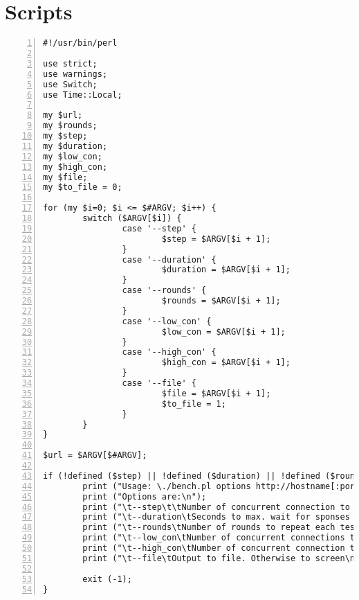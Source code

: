 \documentclass[Scripts]{subfiles}
\begin{document}
\section{Scripts}
\label{sec:Scripts}
\begin{lstlisting}[frame=single,caption=bench.pl,backgroundcolor=\color{gray},breaklines=true,numbers=left,]
#!/usr/bin/perl

use strict;
use warnings;
use Switch;
use Time::Local;

my $url;
my $rounds;
my $step;
my $duration;
my $low_con;
my $high_con;
my $file;
my $to_file = 0;

for (my $i=0; $i <= $#ARGV; $i++) {
        switch ($ARGV[$i]) {
                case '--step' {
                        $step = $ARGV[$i + 1];
                }
                case '--duration' {
                        $duration = $ARGV[$i + 1];
                }
                case '--rounds' {
                        $rounds = $ARGV[$i + 1];
                }
                case '--low_con' {
                        $low_con = $ARGV[$i + 1];
                }
                case '--high_con' {
                        $high_con = $ARGV[$i + 1];
                }
                case '--file' {
                        $file = $ARGV[$i + 1];
                        $to_file = 1;
                }
        }
}

$url = $ARGV[$#ARGV];

if (!defined ($step) || !defined ($duration) || !defined ($rounds) || !defined ($low_con) || !defined ($high_con) || !defined ($url)) {
        print ("Usage: \./bench.pl options http://hostname[:port]/path\n");
        print ("Options are:\n");
        print ("\t--step\t\tNumber of concurrent connection to increment each step with\n");
        print ("\t--duration\tSeconds to max. wait for sponses for each round. ab implies -n 50000\n");
        print ("\t--rounds\tNumber of rounds to repeat each test\n");
        print ("\t--low_con\tNumber of concurrent connections to start with\n");
        print ("\t--high_con\tNumber of concurrent connection to end with\n");
        print ("\t--file\tOutput to file. Otherwise to screen\n");

        exit (-1);
}

\end{lstlisting}
\end{document}
